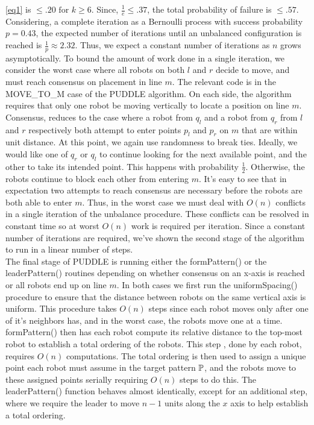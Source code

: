 \documentclass[preprint,10pt]{elsarticle}
\begin{document}
		\ref{eq1} is $\leq  .20 \text{ for } 
		k \geq 6$. Since, $\frac{1}{e} \leq .37$, the total probability of failure is $\leq .57$. Considering, a complete
		iteration as a Bernoulli process with success probability $p = 0.43$, the expected number of iterations until 
		an unbalanced configuration is reached is $\frac{1}{p} \approx 2.32$. Thus, we expect a constant number of iterations
		as $n$ grows asymptotically. To bound the amount of work done in a single iteration, we consider the worst case
		where all robots on both $l$ and $r$ decide to move, and must reach consensus on placement in line $m$. 
		The relevant code is in the MOVE\_TO\_M case of the PUDDLE algorithm. On each side, the algorithm requires that only 
		one robot be moving vertically to locate a position on line $m$. Consensus, reduces to the case where a robot
		from $q_l$ and a robot from $q_r$ from $l$ and $r$ respectively both attempt to enter 
		points $p_l$ and $p_r$ on $m$ that are within unit distance. At this point, we again use randomness
		to break ties. Ideally, we would like one of $q_r$ or $q_l$ to continue looking for the next available point,
		and the other to take its intended point. This happens with probability $\frac{1}{2}$. Otherwise, the robots 
		continue to block each other from entering $m$. It's easy to see that in expectation two attempts to reach
		consensus are necessary before the robots are both able to enter $m$. Thus, in the worst case we must deal with
		$O(n)$ conflicts in a single iteration of the unbalance procedure. These conflicts can be resolved in 
		constant time so at worst $O(n)$ work is required per iteration. Since a constant number of iterations are 
		required, we've shown the second stage of the algorithm to run in a linear number of steps. \\

		The final stage of PUDDLE is running either the formPattern() or the leaderPattern() routines depending on
		whether consensus on an x-axis is reached or all robots end up on line $m$. In both cases we first run the 
		uniformSpacing() procedure to ensure that the distance between robots on the same vertical axis is uniform.
		This procedure takes $O(n)$ steps since each robot moves only after one of it's neighbors has, and in 
		the worst case, the robots move one at a time. formPattern() then has each robot compute its relative
		distance to the top-most robot to establish a total ordering of the robots. This step
		, done by each robot, requires $O(n)$ computations. The total ordering is then used to assign a
		unique point each robot must assume in the target pattern $\mathbb{P}$, and the robots move to these 
		assigned points serially requiring $O(n)$ steps to do this. The leaderPattern() function behaves almost
		identically, except for an additional step, where we require the leader to move $n-1$ units along the
		$x$ axis to help establish a total ordering. \\
\end{document}
